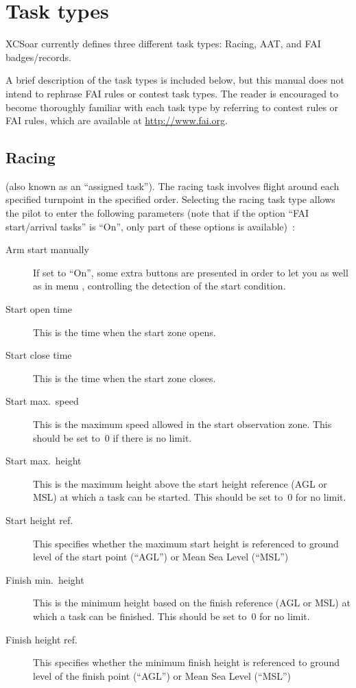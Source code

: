 \section{Task types}
XCSoar currently defines three different task types: Racing, AAT, and FAI badges/records.

A brief description of the task types is included below, but this manual does 
not intend to rephrase FAI rules or contest task types. The reader is encouraged 
to become thoroughly familiar with each task type by referring to contest rules 
or FAI rules, which are available at \url{http://www.fai.org}. 


\subsection*{Racing}
(also known as an ``assigned task'').  The racing task involves flight
around each specified turnpoint in the specified order.  Selecting the racing task 
type allows the pilot to enter the following parameters
(note that if the option
``FAI start/arrival tasks'' is ``On'', only part of these options is available)~:
  \begin{description}
  \item [Arm start manually] If set to ``On'', some extra buttons are presented 
  in order to let you  as well as  in 
  menu , controlling  the detection of the start condition.
  \item [Start open time] This is the time when the start zone opens.
  \item [Start close time] This is the time when the start zone closes.
  \item [Start max.\ speed] This is the maximum speed allowed in the start observation
    zone.  This should be set to~0 if there is no limit.
  \item [Start max.\ height] This is the maximum height above the start height
    reference (AGL or MSL) at which a task can be started.  This  should be set to~0
    for no limit.
  \item [Start height ref.] This specifies whether the maximum start height is 
    referenced to ground level of the start point (``AGL'') or Mean Sea Level (``MSL'')
  \item [Finish min.\ height] This is the minimum height based on the finish
    reference (AGL or MSL) at which a task can be finished.  This should be set
    to~0 for no limit.
  \item [Finish height ref.] This specifies whether the minimum finish height 
    is referenced to ground level of the finish point (``AGL'') or Mean Sea Level (``MSL'')
  \end{description}

